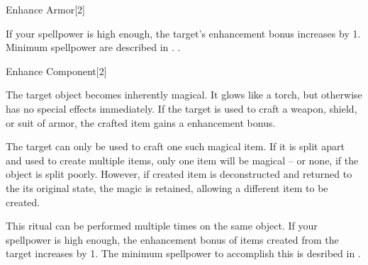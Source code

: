 \begin{spellsection}{Enhance Armor}[2]
    \begin{spellheader}
    \end{spellheader}
    \begin{spellcontent}
        \begin{spelltargetinginfo}
        \end{spelltargetinginfo}
        \begin{spelleffects}

            \spelleffect If your spellpower is high enough, the target's enhancement bonus increases by 1. Minimum spellpower are described in .
            .
        \end{spelleffects}
    \end{spellcontent}
    \begin{spellfooter}
    \end{spellfooter}
\end{spellsection}

\begin{spellsection}{Enhance Component}[2]
    \begin{spellcontent}
        \begin{spelltargetinginfo}
        \end{spelltargetinginfo}
        \begin{spelleffects}
            \spelleffect The target object becomes inherently magical.
            It glows like a torch, but otherwise has no special effects immediately.
            If the target is used to craft a weapon, shield, or suit of armor, the crafted item gains a  enhancement bonus.

            The target can only be used to craft one such magical item.
            If it is split apart and used to create multiple items, only one item will be magical -- or none, if the object is split poorly.
            However, if created item is deconstructed and returned to the its original state, the magic is retained, allowing a different item to be created.

            This ritual can be performed multiple times on the same object.
            If your spellpower is high enough, the enhancement bonus of items created from the target increases by 1.
            The minimum spellpower to accomplish this is desribed in .
        \end{spelleffects}
    \end{spellcontent}
    \begin{spellfooter}
    \end{spellfooter}
\end{spellsection}

